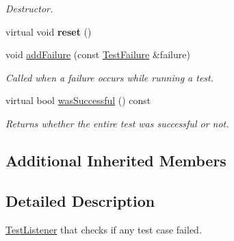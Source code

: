 \begin{DoxyCompactItemize}
\begin{DoxyCompactList}\small\item\em Destructor. \end{DoxyCompactList}\item 
\hypertarget{class_test_success_listener_aa6172d9c318a9a0fdb789b7668550290}{virtual void {\bfseries reset} ()}\label{class_test_success_listener_aa6172d9c318a9a0fdb789b7668550290}

\item 
void \hyperlink{class_test_success_listener_a912bb5ea408b2be5b39cfb45e1bb402f}{add\+Failure} (const \hyperlink{class_test_failure}{Test\+Failure} \&failure)
\begin{DoxyCompactList}\small\item\em Called when a failure occurs while running a test. \end{DoxyCompactList}\item 
\hypertarget{class_test_success_listener_aa33c3787a9251216c2ed4a865b4d4249}{virtual bool \hyperlink{class_test_success_listener_aa33c3787a9251216c2ed4a865b4d4249}{was\+Successful} () const }\label{class_test_success_listener_aa33c3787a9251216c2ed4a865b4d4249}

\begin{DoxyCompactList}\small\item\em Returns whether the entire test was successful or not. \end{DoxyCompactList}\end{DoxyCompactItemize}
\subsection*{Additional Inherited Members}


\subsection{Detailed Description}
\hyperlink{class_test_listener}{Test\+Listener} that checks if any test case failed. 

